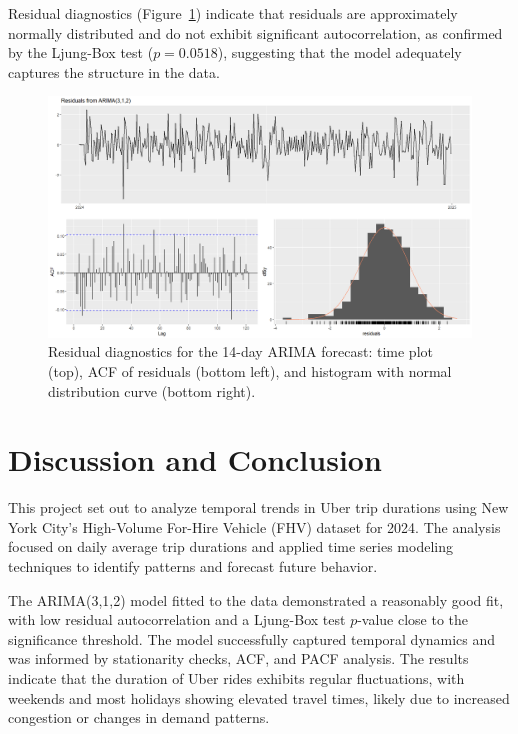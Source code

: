 \documentclass{article}
\begin{document}
Residual diagnostics (Figure~\ref{fig:forecast_diagnostics}) indicate that residuals are approximately normally distributed and do not exhibit significant autocorrelation, as confirmed by the Ljung-Box test ($p = 0.0518$), suggesting that the model adequately captures the structure in the data.

\begin{figure}
  \includegraphics[width=\textwidth]{finalproject/images/forecast-residuals.png}
  \caption{Residual diagnostics for the 14-day ARIMA forecast: time plot (top), ACF of residuals (bottom left), and histogram with normal distribution curve (bottom right). }
  \label{fig:forecast_diagnostics}
\end{figure}


\section{Discussion and Conclusion}

This project set out to analyze temporal trends in Uber trip durations using New York City's High-Volume For-Hire Vehicle (FHV) dataset for 2024. The analysis focused on daily average trip durations and applied time series modeling techniques to identify patterns and forecast future behavior.

The ARIMA(3,1,2) model fitted to the data demonstrated a reasonably good fit, with low residual autocorrelation and a Ljung-Box test $p$-value close to the significance threshold. The model successfully captured temporal dynamics and was informed by stationarity checks, ACF, and PACF analysis. The results indicate that the duration of Uber rides exhibits regular fluctuations, with weekends and most holidays showing elevated travel times, likely due to increased congestion or changes in demand patterns.
\end{document}

